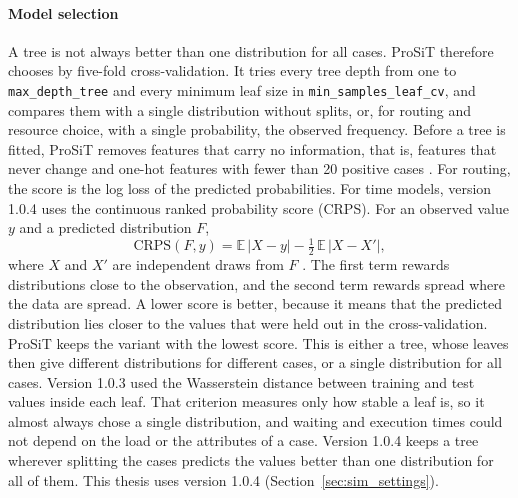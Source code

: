 \paragraph{Model selection}
A tree is not always better than one distribution for all cases. ProSiT
therefore chooses by five-fold cross-validation. It tries every tree depth
from one to \texttt{max\_depth\_tree} and every minimum leaf size in
\texttt{min\_samples\_leaf\_cv}, and compares them with a single distribution
without splits, or, for routing and resource choice, with a single probability,
the observed frequency. Before a tree is fitted, ProSiT removes features that
carry no information, that is, features that never change and one-hot features with
fewer than 20 positive cases \cite{ProSiTDocs}. For routing, the score is the log
loss of the predicted probabilities. For time models, version 1.0.4 uses the continuous ranked
probability score (CRPS). For an observed value $y$ and a predicted
distribution $F$,
\begin{equation}
\mathrm{CRPS}(F,y)=\mathbb{E}\,|X-y|-\tfrac{1}{2}\,\mathbb{E}\,|X-X'|,
\end{equation}
where $X$ and $X'$ are independent draws from $F$ \cite{Gneiting2007CRPS}. The
first term rewards distributions close to the observation, and the second term
rewards spread where the data are spread. A lower score is better, because it
means that the predicted distribution lies closer to the values that were held
out in the cross-validation. ProSiT keeps the variant with the lowest score. This
is either a tree, whose leaves then give different distributions for different
cases, or a single distribution for all cases. Version 1.0.3 used the
Wasserstein distance between training and test values inside each leaf. That
criterion measures only how stable a leaf is, so it almost always chose a single
distribution, and waiting and execution times could not depend on the load or
the attributes of a case. Version 1.0.4 keeps a tree wherever splitting the cases
predicts the values better than one distribution for all of them. This thesis
uses version 1.0.4 (Section~\ref{sec:sim_settings}).

